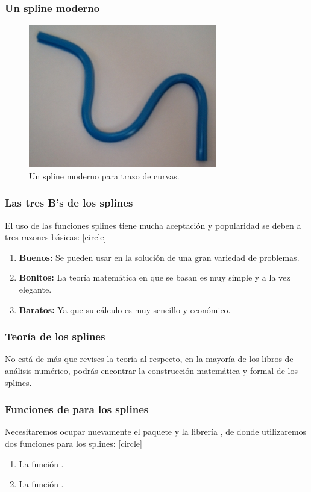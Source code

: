 \begin{frame}
\frametitle{Un spline moderno}
\begin{figure}
	\centering
	\includegraphics[scale=0.5]{Imagenes/spline_02.jpg}
	\caption{Un spline moderno para trazo de curvas.}
	\label{fig:figura_spline_02}
\end{figure}
	\end{frame}
\begin{frame}
\frametitle{Las tres B's de los splines}
El uso de las funciones splines tiene mucha aceptación y popularidad se deben a tres razones básicas:
[circle]
\begin{enumerate}[<+->]
\item \textbf{Buenos:} Se  pueden usar en la solución de una gran variedad de problemas.
\item \textbf{Bonitos:} La teoría matemática en que se basan es muy simple y a la vez elegante.
\item \textbf{Baratos:} Ya que su cálculo es muy sencillo y económico.
\end{enumerate}
\end{frame}
\begin{frame}
\frametitle{Teoría de los splines}
No está de más que revises la teoría al respecto, en la mayoría de los libros de análisis numérico, podrás encontrar la construcción matemática y formal de los splines.
\end{frame}
\begin{frame}
\frametitle{Funciones de \python{} para los splines}
Necesitaremos ocupar nuevamente el paquete  y la librería , de donde utilizaremos dos funciones para los splines:
[circle]
\begin{enumerate}[<+->]
\item La función .
\item La función .
\end{enumerate}
\end{frame}
